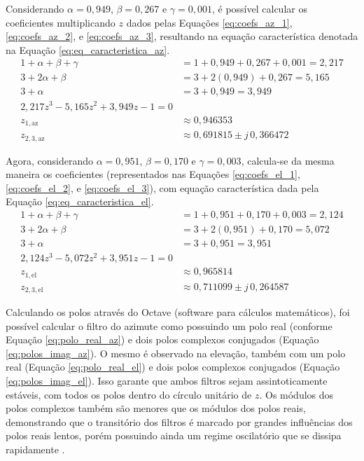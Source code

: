 Considerando $\alpha = 0{,}949$, $\beta = 0{,}267$ e $\gamma = 0{,}001$, é possível calcular os coeficientes multiplicando $z$ dados pelas Equações \ref{eq:coefs_az_1}, \ref{eq:coefs_az_2}, e \ref{eq:coefs_az_3}, resultando na equação característica denotada na Equação \ref{eq:eq_caracteristica_az}.
\begin{align}
    1 + \alpha + \beta + \gamma &= 1 + 0{,}949 + 0{,}267 + 0{,}001 = 2{,}217 \label{eq:coefs_az_1}\\
    3 + 2\alpha + \beta &= 3 + 2(0{,}949) + 0{,}267 = 5{,}165 \label{eq:coefs_az_2}\\
    3 + \alpha &= 3 + 0{,}949 = 3{,}949 \label{eq:coefs_az_3} \\
    2{,}217z^3 - 5{,}165z^2 + 3{,}949z - 1 = 0 \label{eq:eq_caracteristica_az} \\
    z_{1,\text{az}} &\approx 0{,}946353 \label{eq:polo_real_az}\\
    z_{2,3,\text{az}} &\approx 0{,}691815 \pm j\,0{,}366472 \label{eq:polos_imag_az}
\end{align}

Agora, considerando $\alpha = 0{,}951$, $\beta = 0{,}170$ e $\gamma = 0{,}003$, calcula-se da mesma maneira os coeficientes (representados nas Equações \ref{eq:coefs_el_1}, \ref{eq:coefs_el_2}, e \ref{eq:coefs_el_3}), com equação característica dada pela Equação \ref{eq:eq_caracteristica_el}.
\begin{align}
    1 + \alpha + \beta + \gamma &= 1 + 0{,}951 + 0{,}170 + 0{,}003 = 2{,}124 \label{eq:coefs_el_1}\\
    3 + 2\alpha + \beta &= 3 + 2(0{,}951) + 0{,}170 = 5{,}072 \label{eq:coefs_el_2}\\
    3 + \alpha &= 3 + 0{,}951 = 3{,}951 \label{eq:coefs_el_3} \\
    2{,}124z^3 - 5{,}072z^2 + 3{,}951z - 1 = 0 \label{eq:eq_caracteristica_el} \\
    z_{1,\text{el}} &\approx 0{,}965814 \label{eq:polo_real_el}\\
    z_{2,3,\text{el}} &\approx 0{,}711099 \pm j\,0{,}264587 \label{eq:polos_imag_el}
\end{align}

Calculando os polos através do Octave (software para cálculos matemáticos), foi possível calcular o filtro do azimute como possuindo um polo real (conforme Equação \ref{eq:polo_real_az}) e dois polos complexos conjugados (Equação \ref{eq:polos_imag_az}).
O mesmo é observado na elevação, também com um polo real (Equação \ref{eq:polo_real_el}) e dois polos complexos conjugados (Equação \ref{eq:polos_imag_el}).
Isso garante que ambos filtros sejam assintoticamente estáveis, com todos os polos dentro do círculo unitário de $z$.
Os módulos dos polos complexos também são menores que os módulos dos polos reais, demonstrando que o transitório dos filtros é marcado por grandes influências dos polos reais lentos, porém possuindo ainda um regime oscilatório que se dissipa rapidamente \cite{kalata1984}.

